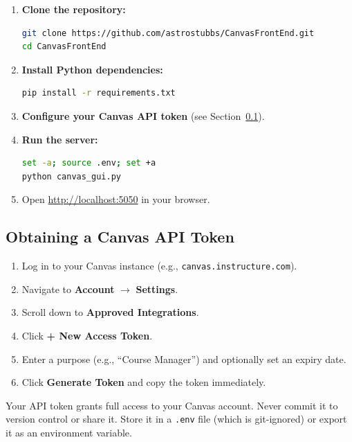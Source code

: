 \documentclass[12pt,letterpaper]{article}
\begin{document}
\begin{enumerate}[leftmargin=*]
    \item \textbf{Clone the repository:}
\begin{lstlisting}[language=bash]
git clone https://github.com/astrostubbs/CanvasFrontEnd.git
cd CanvasFrontEnd
\end{lstlisting}

    \item \textbf{Install Python dependencies:}
\begin{lstlisting}[language=bash]
pip install -r requirements.txt
\end{lstlisting}

    \item \textbf{Configure your Canvas API token} (see Section~\ref{sec:apikey}).

    \item \textbf{Run the server:}
\begin{lstlisting}[language=bash]
set -a; source .env; set +a
python canvas_gui.py
\end{lstlisting}

    \item Open \url{http://localhost:5050} in your browser.
\end{enumerate}

\subsection{Obtaining a Canvas API Token}
\label{sec:apikey}

\begin{enumerate}[leftmargin=*]
    \item Log in to your Canvas instance (e.g., \texttt{canvas.instructure.com}).
    \item Navigate to \textbf{Account} $\rightarrow$ \textbf{Settings}.
    \item Scroll down to \textbf{Approved Integrations}.
    \item Click \textbf{+ New Access Token}.
    \item Enter a purpose (e.g., ``Course Manager'') and optionally set an expiry date.
    \item Click \textbf{Generate Token} and copy the token immediately.
\end{enumerate}

\begin{warnbox}
Your API token grants full access to your Canvas account. Never commit it to version control or share it. Store it in a \texttt{.env} file (which is git-ignored) or export it as an environment variable.
\end{warnbox}
\end{document}
